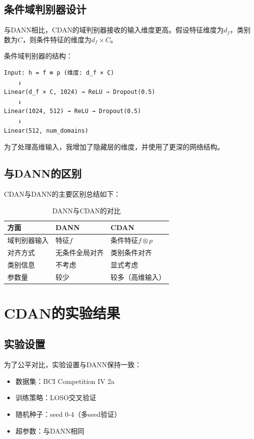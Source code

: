 \documentclass[12pt,a4paper]{ctexart}
\begin{document}
\subsection{条件域判别器设计}

与DANN相比，CDAN的域判别器接收的输入维度更高。假设特征维度为$d_f$，类别数为$C$，则条件特征的维度为$d_f \times C$。

条件域判别器的结构：

\begin{verbatim}
Input: h = f ⊗ p (维度: d_f × C)
    ↓
Linear(d_f × C, 1024) → ReLU → Dropout(0.5)
    ↓
Linear(1024, 512) → ReLU → Dropout(0.5)
    ↓
Linear(512, num_domains)
\end{verbatim}

为了处理高维输入，我增加了隐藏层的维度，并使用了更深的网络结构。

\subsection{与DANN的区别}

CDAN与DANN的主要区别总结如下：

\begin{table}[H]
\centering
\caption{DANN与CDAN的对比}
\label{tab:dann_vs_cdan}
\begin{tabular}{lll}
\toprule
\textbf{方面} & \textbf{DANN} & \textbf{CDAN} \\
\midrule
域判别器输入 & 特征$f$ & 条件特征$f \otimes p$ \\
对齐方式 & 无条件全局对齐 & 类别条件对齐 \\
类别信息 & 不考虑 & 显式考虑 \\
参数量 & 较少 & 较多（高维输入） \\
\bottomrule
\end{tabular}
\end{table}

\section{CDAN的实验结果}

\subsection{实验设置}

为了公平对比，实验设置与DANN保持一致：
\begin{itemize}
    \item 数据集：BCI Competition IV 2a
    \item 训练策略：LOSO交叉验证
    \item 随机种子：seed 0-4（多seed验证）
    \item 超参数：与DANN相同
\end{itemize}
\end{document}
